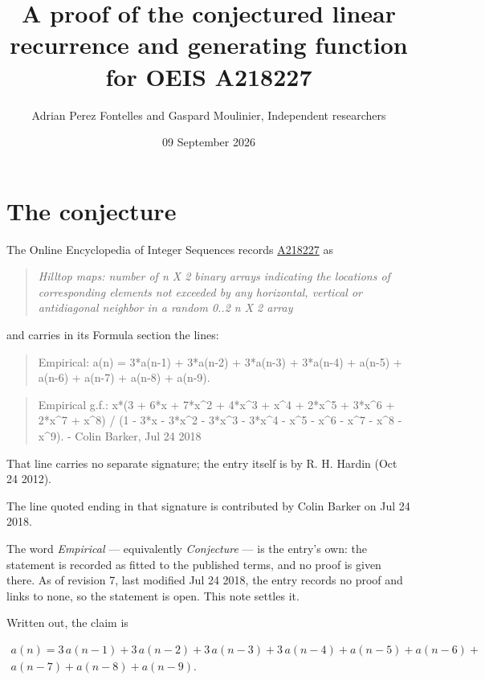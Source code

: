 \documentclass[11pt]{article}
\title{A proof of the conjectured linear recurrence and generating function for OEIS A218227}
\author{Adrian Perez Fontelles and Gaspard Moulinier, Independent researchers}
\date{09 September 2026}
\theoremstyle{definition}
\begin{document}
\maketitle
\section{The conjecture}

The Online Encyclopedia of Integer Sequences records \href{https://oeis.org/A218227}{A218227} as

\begin{quote}\itshape Hilltop maps: number of n X 2 binary arrays indicating the locations of corresponding elements not exceeded by any horizontal, vertical or antidiagonal neighbor in a random 0..2 n X 2 array\end{quote}

and carries in its Formula section the lines:

\begin{quote}\ttfamily Empirical: a(n) = 3*a(n-1) + 3*a(n-2) + 3*a(n-3) + 3*a(n-4) + a(n-5) + a(n-6) + a(n-7) + a(n-8) + a(n-9).\end{quote}

\begin{quote}\ttfamily Empirical g.f.: x*(3 + 6*x + 7*x\textasciicircum{}2 + 4*x\textasciicircum{}3 + x\textasciicircum{}4 + 2*x\textasciicircum{}5 + 3*x\textasciicircum{}6 + 2*x\textasciicircum{}7 + x\textasciicircum{}8) / (1 - 3*x - 3*x\textasciicircum{}2 - 3*x\textasciicircum{}3 - 3*x\textasciicircum{}4 - x\textasciicircum{}5 - x\textasciicircum{}6 - x\textasciicircum{}7 - x\textasciicircum{}8 - x\textasciicircum{}9). - Colin Barker, Jul 24 2018\end{quote}

That line carries no separate signature; the entry itself is by R. H. Hardin (Oct 24 2012).

The line quoted ending in that signature is contributed by Colin Barker on Jul 24 2018.

The word {\itshape Empirical} --- equivalently {\itshape Conjecture} --- is the entry's own: the statement is recorded as fitted to the published terms, and no proof is given there. As of revision 7, last modified Jul 24 2018, the entry records no proof and links to none, so the statement is open. This note settles it.

Written out, the claim is

\begin{multline*} a(n) = 3\,a(n-1) + 3\,a(n-2) + 3\,a(n-3) + 3\,a(n-4) + a(n-5) + a(n-6) + \\ a(n-7) + a(n-8) + a(n-9). \end{multline*}
\end{document}
